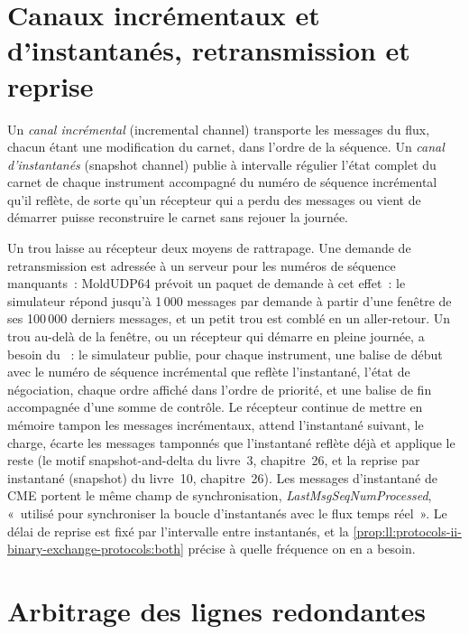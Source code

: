 \section{Canaux incrémentaux et d'instantanés, retransmission et reprise}

\begin{definition}\label{def:ll:protocols-ii-binary-exchange-protocols:channels}
Un \emph{canal incrémental} (incremental channel) transporte les messages du flux, chacun étant une modification du carnet, dans l'ordre de la séquence.
Un \emph{canal d'instantanés} (snapshot channel) publie à intervalle régulier l'état complet du carnet de chaque instrument
accompagné du numéro de séquence incrémental qu'il reflète, de sorte qu'un récepteur qui a perdu des messages ou vient de démarrer puisse
reconstruire le carnet sans rejouer la journée.
\end{definition}

Un trou laisse au récepteur deux moyens de rattrapage. Une demande de retransmission est adressée à un serveur pour les numéros de séquence manquants~: MoldUDP64 prévoit un
paquet de demande à cet effet~: le simulateur répond jusqu'à 1\,000 messages par demande à partir d'une fenêtre de ses 100\,000 derniers messages, et
un petit trou est comblé en un aller-retour. Un trou au-delà de la fenêtre, ou un récepteur qui démarre en pleine journée, a besoin du
~: le simulateur publie, pour chaque instrument, une balise de début avec le numéro de séquence incrémental que
reflète l'instantané, l'état de négociation, chaque ordre affiché dans l'ordre de priorité, et une balise de fin accompagnée d'une somme de contrôle. Le
récepteur continue de mettre en mémoire tampon les messages incrémentaux, attend l'instantané suivant, le charge, écarte les messages tamponnés
que l'instantané reflète déjà et applique le reste (le motif snapshot-and-delta du livre~3, chapitre~26, et la
reprise par instantané (snapshot) du livre~10, chapitre~26). Les messages d'instantané de CME portent le même champ de synchronisation,
\emph{LastMsgSeqNumProcessed}, «~utilisé pour synchroniser la boucle d'instantanés avec le flux temps réel~». Le délai de reprise est fixé
par l'intervalle entre instantanés, et la \cref{prop:ll:protocols-ii-binary-exchange-protocols:both} précise à quelle fréquence on en a besoin.

\section{Arbitrage des lignes redondantes}

